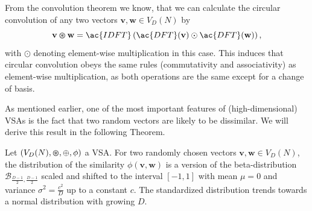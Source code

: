 \begin{ex}
\begin{enumerate}
\begin{equation}
        \end{equation}
        From the convolution theorem \parencite[see][Chap. 6]{Bracewell2000} we know, that we can calculate the circular convolution of any two vectors $ \mathbf{v}, \mathbf{w} \in V_{D}(N)$ by
        \begin{equation}
        \label{eq:conv_with_dft}
		\mathbf{v} \varoast \mathbf{w} = \ac{IDFT}\left(\ac{DFT}( \mathbf{v}) \odot \ac{DFT}( \mathbf{w}) \right),
        \end{equation}
		with $\odot$ denoting element-wise multiplication in this case.
		This induces that circular convolution obeys the same rules (commutativity and associativity) as element-wise multiplication, as both operations are the same except for a change of basis.
	\end{enumerate}
\end{ex}
As mentioned earlier, one of the most important features of (high-dimensional) \acp{VSA} is the fact that two random vectors are likely to be dissimilar.
We will derive this result in the following Theorem.
\begin{theorem}
	\label{theorem:VSA_cossim_distribution}
	Let $\left(V_{D}(N), \varoast, \oplus, \phi \right)$ a \acl{VSA}.
    For two randomly chosen vectors $ \mathbf{v}, \mathbf{w} \in V_{D}(N)$, the distribution of the similarity $\phi\left( \mathbf{v}, \mathbf{w}\right)$ is a version of the beta-distribution $\mathcal{B}_{\frac{D-1}{2},\frac{D-1}{2}}$ scaled and shifted to the interval $\left[-1,1\right]$ with mean $\mu=0$ and variance $\sigma^2=\frac{c^2}{D}$ up to a constant $c$.
    The standardized distribution trends towards a normal distribution with growing $D$.
\end{theorem}
